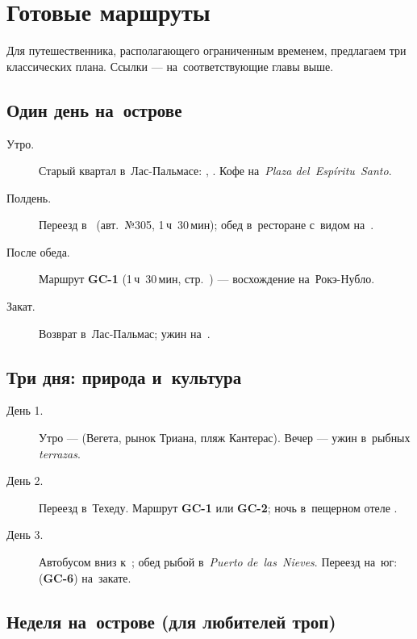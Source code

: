 \chapter{Готовые маршруты}

Для путешественника, располагающего ограниченным временем,
предлагаем три классических плана. Ссылки --- на~соответствующие
главы выше.

\section{Один день на~острове}

\begin{description}
\item[Утро.] Старый квартал  в~Лас-Пальмасе:
  , .
  Кофе на~\textit{Plaza del~Espíritu~Santo}.
\item[Полдень.] Переезд в~ (авт.~№305, 1\,ч~30\,мин);
  обед в~ресторане с~видом на~.
\item[После обеда.] Маршрут \textbf{GC-1} (1\,ч~30\,мин,
  стр.~\pageref{hike:gc1}) --- восхождение на~Рокэ-Нубло.
\item[Закат.] Возврат в~Лас-Пальмас; ужин на~.
\end{description}

\section{Три дня: природа и~культура}

\begin{description}
\item[День 1.] Утро ---  (Вегета, рынок Триана,
  пляж Кантерас). Вечер --- ужин в~рыбных \textit{terrazas}.
\item[День 2.] Переезд в~Техеду. Маршрут \textbf{GC-1} или
  \textbf{GC-2}; ночь в~пещерном отеле .
\item[День 3.] Автобусом вниз к~; обед рыбой
  в~\textit{Puerto de~las~Nieves}. Переезд на~юг:  (\textbf{GC-6}) на~закате.
\end{description}

\section{Неделя на~острове (для любителей троп)}


